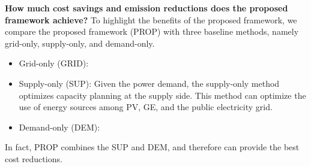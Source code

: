 \textbf{How much cost savings and emission reductions does the proposed framework achieve?} To highlight the benefits of the proposed framework, we compare the proposed framework (PROP) with three baseline methods, namely grid-only, supply-only, and demand-only. 
\begin{itemize}

 \item Grid-only (GRID): 

 \item Supply-only (SUP): Given the power demand, the supply-only method optimizes capacity planning at the supply side.
This method can optimize the use of energy sources among PV, GE, and the public electricity grid. 

 \item Demand-only (DEM): 

\end{itemize}
In fact, PROP combines the SUP and DEM, and therefore can provide the best cost reductions.

